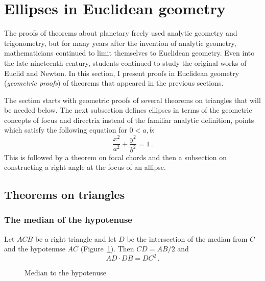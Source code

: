 
\section{Ellipses in Euclidean geometry}\label{s.geometry}

The proofs of theorems about planetary freely used analytic geometry and trigonometry, but for many years after the invention of analytic geometry, mathematicians continued to limit themselves to Euclidean geometry. Even into the late nineteenth century, students continued to study the original works of Euclid and Newton. In this section, I present proofs in Euclidean geometry (\emph{geometric proofs}) of theorems that appeared in the previous sections. 

The section starts with geometric proofs of several theorems on triangles that will be needed below. The next subsection defines ellipses in terms of the geometric concepts of focus and directrix instead of the familiar analytic definition, points which satisfy the following equation for $0<a,b$:
\[
\frac{x^2}{a^2}+\frac{y^2}{b^2}=1\,.
\]
This is followed by a theorem on focal chords and then a subsection on constructing a right angle at the focus of an allipse.


\subsection{Theorems on triangles}

\subsubsection*{The median of the hypotenuse}

\begin{theorem}
Let $ACB$ be a right triangle and let $D$ be the intersection of the median from $C$ and the hypotenuse $AC$ (Figure~\ref{f.median}). Then $CD=AB/2$ and
\[
AD \cdot DB = DC^2\,.
\]
\end{theorem}


\begin{figure}[b]
\begin{center}
\end{center}
\caption{Median to the hypotenuse}\label{f.median}
\end{figure}

